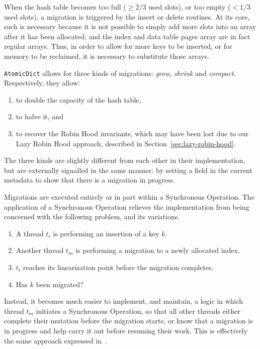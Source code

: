 When the hash table becomes too full ($\geq 2/3$ used slots), or too empty ($< 1/3$ used slots), a migration is triggered by the insert or delete routines.
At its core, such is necessary because it is not possible to simply add more slots into an array after it has been allocated; and the index and data table pages array are in fact regular arrays.
Thus, in order to allow for more keys to be inserted, or for memory to be reclaimed, it is necessary to substitute those arrays.

\texttt{AtomicDict} allows for three kinds of migrations: \emph{grow}, \emph{shrink} and \emph{compact}.
Respectively, they allow:
\begin{enumerate}
    \item to double the capacity of the hash table,
    \item to halve it, and
    \item to recover the Robin Hood invariants, which may have been lost due to our Lazy Robin Hood approach, described in Section~\ref{sec:lazy-robin-hood}.
\end{enumerate}
The three kinds are slightly different from each other in their implementation, but are externally signalled in the same manner: by setting a field in the current metadata to show that there is a migration in progress.

Migrations are executed entirely or in part within a Synchronous Operation.
The application of a Synchronous Operation relieves the implementation from being concerned with the following problem, and its variations.
\begin{enumerate}
    \item A thread $t_i$ is performing an insertion of a key $k$.
    \item Another thread $t_m$ is performing a migration to a newly allocated index.
    \item $t_i$ reaches its linearization point before the migration completes.
    \item Has $k$ been migrated?
\end{enumerate}
Instead, it becomes much easier to implement, and maintain, a logic in which thread $t_m$ initiates a Synchronous Operation, so that all other threads either complete their mutation before the migration starts, or know that a migration is in progress and help carry it out before resuming their work.
This is effectively the same approach expressed in~\cite[\S5.3.2, Preventing Concurrent Updates to Ensure Consistency]{maier}.

